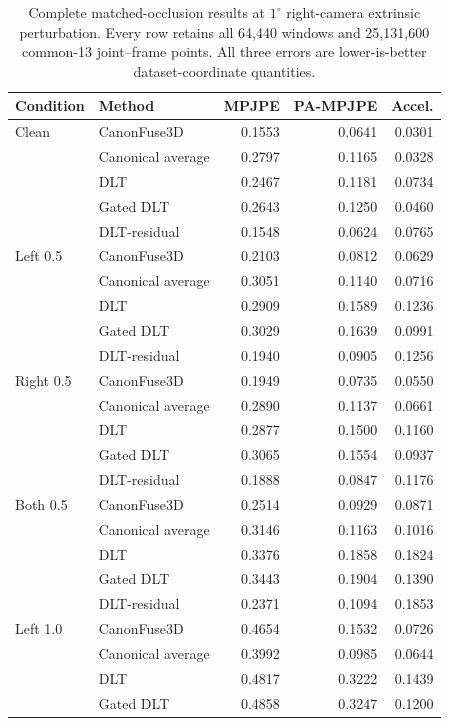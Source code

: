 \begin{table}[htbp]
\centering
\caption{Complete matched-occlusion results at $1^\circ$ right-camera extrinsic perturbation. Every row retains all 64,440 windows and 25,131,600 common-13 joint--frame points. All three errors are lower-is-better dataset-coordinate quantities.}
\label{tab:c07_full_1}
\small
\setlength{\tabcolsep}{4pt}
\begin{tabular}{llrrr}
\toprule
Condition & Method & MPJPE & PA-MPJPE & Accel. \\
\midrule
Clean & CanonFuse3D & 0.1553 & 0.0641 & 0.0301 \\
 & Canonical average & 0.2797 & 0.1165 & 0.0328 \\
 & DLT & 0.2467 & 0.1181 & 0.0734 \\
 & Gated DLT & 0.2643 & 0.1250 & 0.0460 \\
 & DLT-residual & 0.1548 & 0.0624 & 0.0765 \\
Left 0.5 & CanonFuse3D & 0.2103 & 0.0812 & 0.0629 \\
 & Canonical average & 0.3051 & 0.1140 & 0.0716 \\
 & DLT & 0.2909 & 0.1589 & 0.1236 \\
 & Gated DLT & 0.3029 & 0.1639 & 0.0991 \\
 & DLT-residual & 0.1940 & 0.0905 & 0.1256 \\
Right 0.5 & CanonFuse3D & 0.1949 & 0.0735 & 0.0550 \\
 & Canonical average & 0.2890 & 0.1137 & 0.0661 \\
 & DLT & 0.2877 & 0.1500 & 0.1160 \\
 & Gated DLT & 0.3065 & 0.1554 & 0.0937 \\
 & DLT-residual & 0.1888 & 0.0847 & 0.1176 \\
Both 0.5 & CanonFuse3D & 0.2514 & 0.0929 & 0.0871 \\
 & Canonical average & 0.3146 & 0.1163 & 0.1016 \\
 & DLT & 0.3376 & 0.1858 & 0.1824 \\
 & Gated DLT & 0.3443 & 0.1904 & 0.1390 \\
 & DLT-residual & 0.2371 & 0.1094 & 0.1853 \\
Left 1.0 & CanonFuse3D & 0.4654 & 0.1532 & 0.0726 \\
 & Canonical average & 0.3992 & 0.0985 & 0.0644 \\
 & DLT & 0.4817 & 0.3222 & 0.1439 \\
 & Gated DLT & 0.4858 & 0.3247 & 0.1200 \\

\end{tabular}
\end{table}
